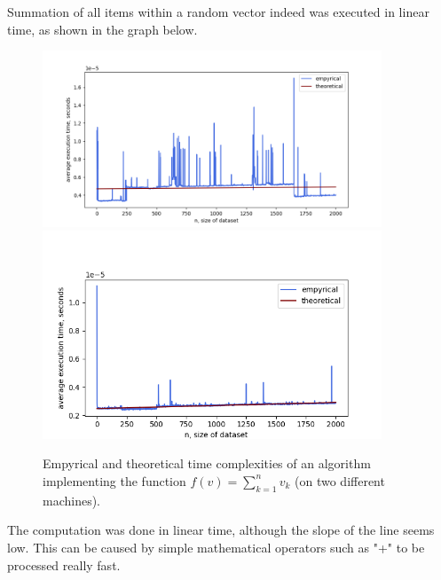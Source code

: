 \documentclass[12pt, a4paper]{article}
\begin{document}
\newpage

Summation of all items within a random vector indeed was executed in linear time, as shown in the graph below.
\begin{figure}[!h]
\centering
\includegraphics[width=0.9\textwidth]{sum.png}
\includegraphics[width=0.9\textwidth]{valeria/sum.png}
\caption{Empyrical and theoretical time complexities of an algorithm implementing the function $f(v)=\sum_{k=1}^{n} v_k$ (on two different machines).}
\end{figure}

The computation was done in linear time, although the slope of the line seems low. This can be caused by simple mathematical operators such as "+" to be processed really fast.

\newpage
\end{document}
